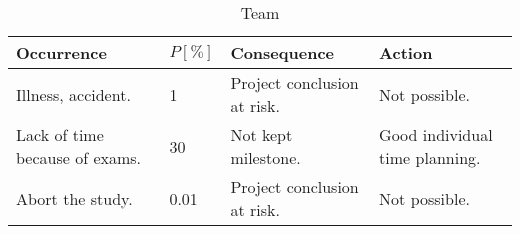 \begin{longtable}{|X|p{1.2cm}|X|X|}
	\caption[]{\label{tab:riskListTeam} Team }\\
	\hline
	\textbf{Occurrence} &
	\textbf{$P [\%]$} &
	\textbf{Consequence} &
	\textbf{Action} \\
	\hline
	\hline
	Illness, accident. &
	1 &
	Project conclusion at risk. &
    Not possible. \\
	\hline
	Lack of time because of exams. &
	30 &
	Not kept milestone. &
	Good individual time planning. \\
	\hline
	Abort the study. &
	0.01 &
	Project conclusion at risk. &
	Not possible. \\
	\hline
\end{longtable}
